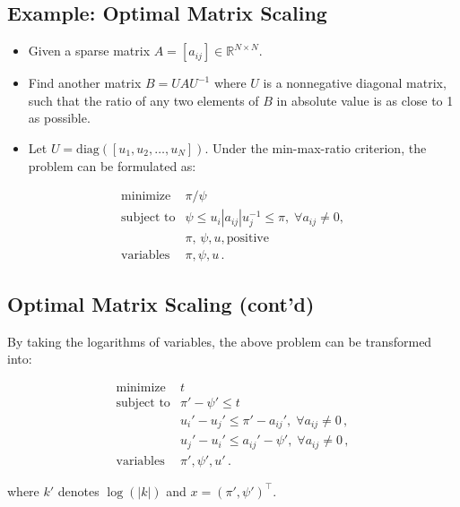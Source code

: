 \documentclass[]{article}
\begin{document}
\hypertarget{example-optimal-matrix-scaling}{%
\subsection{Example: Optimal Matrix
Scaling}\label{example-optimal-matrix-scaling}}

\begin{itemize}
\item
  Given a sparse matrix \(A = [a_{ij}] \in \mathbb{R}^{N\times N}\).
\item
  Find another matrix \(B = U A U^{-1}\) where \(U\) is a nonnegative
  diagonal matrix, such that the ratio of any two elements of \(B\) in
  absolute value is as close to 1 as possible.
\item
  Let \(U = \mathrm{diag}([u_1, u_2, \ldots, u_N])\). Under the
  min-max-ratio criterion, the problem can be formulated as:
\end{itemize}

\[\begin{array}{ll}
  \text{minimize}   &   \pi/\psi  \\
  \text{subject to} &   \psi \leq u_i |a_{ij}| u_j^{-1} \leq \pi, \; \forall a_{ij} \neq 0 , \\
                    &   \pi, \, \psi, u, \text{positive} \\
  \text{variables}  &   \pi, \psi, u \, .
  \end{array}\]

\hypertarget{optimal-matrix-scaling-contd}{%
\subsection{Optimal Matrix Scaling
(cont'd)}\label{optimal-matrix-scaling-contd}}

By taking the logarithms of variables, the above problem can be
transformed into:

\[\begin{array}{ll}
  \text{minimize}   &   t \\
  \text{subject to} &   \pi' - \psi' \leq t \\
                    &   u_i' - u_j'  \leq \pi' - a_{ij}', \; \forall a_{ij} \neq 0 \,, \\
                    &   u_j' - u_i' \leq a_{ij}' - \psi', \; \forall a_{ij} \neq 0 \,, \\
  \text{variables}  &   \pi', \psi', u' \, .
  \end{array}\]

where \(k'\) denotes \(\log( | k | )\) and \(x = (\pi', \psi' )^\top\).
\end{document}
